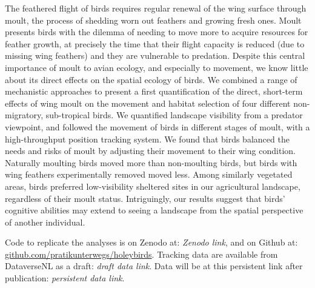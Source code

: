 \small{
    The feathered flight of birds requires regular renewal of the wing surface through moult, the process of shedding worn out feathers and growing fresh ones.
    Moult presents birds with the dilemma of needing to move more to acquire resources for feather growth, at precisely the time that their flight capacity is reduced (due to missing wing feathers) and they are vulnerable to predation.
    Despite this central importance of moult to avian ecology, and especially to movement, we know little about its direct effects on the spatial ecology of birds.
    We combined a range of mechanistic approaches to present a first quantification of the direct, short-term effects of wing moult on the movement and habitat selection of four different non-migratory, sub-tropical birds.
    We quantified landscape visibility from a predator viewpoint, and followed the movement of birds in different stages of moult, with a high-throughput position tracking system.
    We found that birds balanced the needs and risks of moult by adjusting their movement to their wing condition.
    Naturally moulting birds moved more than non-moulting birds, but birds with wing feathers experimentally removed moved less.
    Among similarly vegetated areas, birds preferred low-visibility sheltered sites in our agricultural landscape, regardless of their moult status.
    Intriguingly, our results suggest that birds' cognitive abilities may extend to seeing a landscape from the spatial perspective of another individual.

    Code to replicate the analyses is on Zenodo at: \textit{\color{red}Zenodo link}, and on Github at: 
    \hyperlink{github.com/pratikunterwegs/holeybirds}{github.com/pratikunterwegs/holeybirds}.
    Tracking data are available from DataverseNL as a draft: \textit{\color{red}draft data link}.
    Data will be at this persistent link after publication: \textit{\color{red}persistent data link}.
}

\clearpage
